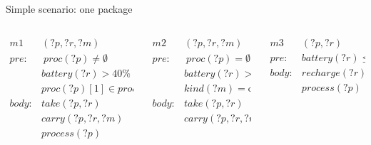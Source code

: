 \begin{frame}[fragile]{Simple scenario: one package}
    \footnotesize
    \begin{columns}[t]
        \begin{column}{0.32\textwidth}
            \begin{align*}
                m1&(?p, ?r, ?m)\\
                pre: &\ proc(?p) \neq \emptyset \\
                 &battery(?r) > 40\% \\
                 &proc(?p)[1] \in proc(?m) \\
                 body:&take(?p,?r) \\
                     &carry(?p,?r,?m) \\
                     &process(?p)
            \end{align*}
        \end{column}
        \begin{column}{0.32\textwidth}
            \begin{align*}
                m2&(?p, ?r, ?m) \\
                pre: &\ proc(?p)  = \emptyset \\
                 &battery(?r) > 40\% \\
                 &kind(?m) = \text{output} \\
                 body:&take(?p,?r) \\
                     &carry(?p,?r,?m) \\
            \end{align*}
        \end{column}
        \begin{column}{0.32\textwidth}
            \begin{align*}
                m3&(?p, ?r) \\ 
                pre: &battery(?r) \leq 40\% \\
                 body:&recharge(?r) \\
                     &process(?p)
            \end{align*}
        \end{column}
    \end{columns}
    
\end{frame}

